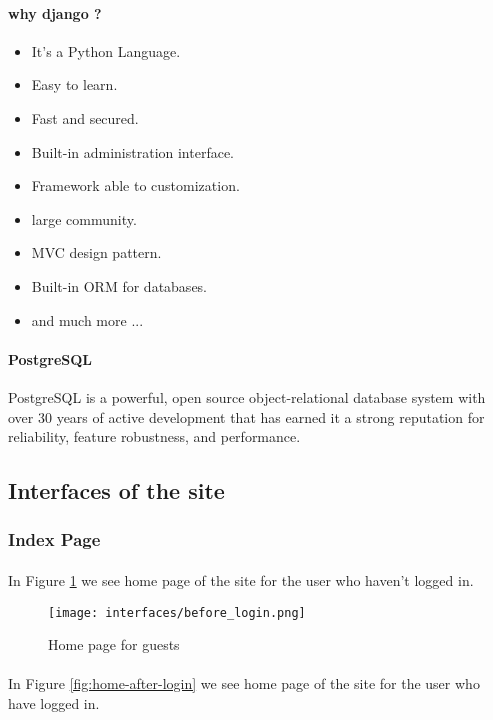 			\paragraph{why django ?}
			\begin{itemize}
				\item It's a Python Language.
				\item Easy to learn.
				\item Fast and secured.
				\item Built-in administration interface.
				\item Framework able to customization.
				\item large community.
				\item MVC design pattern.
				\item Built-in ORM for databases.
				\item and much more ...
			\end{itemize}
		
			\paragraph{PostgreSQL}
			PostgreSQL is a powerful, open source object-relational database system with over 30 years of active development that has earned it a strong reputation for reliability, feature robustness, and performance.\cite{PostgreSQL}
	
	\subsection{Interfaces of the site}
	
	\subsubsection{Index Page}
		\paragraph{}
		In Figure \ref{fig:home-before-login} we see home page of the site for the user who haven't logged in.
		
			\begin{figure}[b]
				\centering
				\texttt{[image: interfaces/before\_login.png]}
				\caption{Home page for guests}
				\label{fig:home-before-login}
			\end{figure}

		\paragraph{}
		In Figure \ref{fig:home-after-login} we see home page of the site for the user who have logged in.
		
